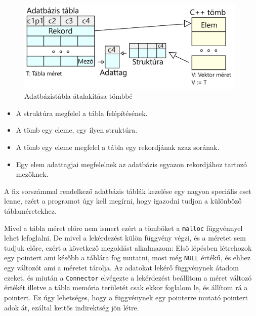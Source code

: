 \begin{figure}[h!]
\centering
\includegraphics[width=11cm]{images/data/structure.png}
\caption{Adatbázistábla átalakítása tömbbé}
\label{fig:opencl}
\end{figure}

\begin{itemize}
\item A struktúra megfelel a tábla felépítésének.
\item A tömb egy eleme, egy ilyen struktúra.
\item A tömb egy eleme megfelel a tábla egy rekordjának azaz sorának.
\item Egy elem adattagjai megfelelnek az adatbázis egyazon rekordjához tartozó mezőknek.
\end{itemize}

\newpage
{}

A fix sorszámmal rendelkező adatbázis táblák kezelése egy nagyon speciális eset lenne, ezért a programot úgy kell megírni, hogy igazodni tudjon a különböző táblaméretekhez.

Mivel a tábla méret előre nem ismert ezért a tömböket a \texttt{malloc} függvénnyel lehet lefoglalni. De mivel a lekérdezést külön függvény végzi, és a méretet sem tudjuk előre, ezért a következő megoldást alkalmazom:
Első lépésben létrehozok egy pointert ami később a táblára fog mutatni, most még \texttt{NULL} értékű, és ehhez egy változót ami a méretet tárolja. Az adatokat lekérő függvénynek átadom ezeket, és miután a \texttt{Connector} elvégezte a lekérdezést beállítom a méret változó értékét illetve a tábla memória területét csak ekkor foglalom le, és állítom rá a pointert. Ez úgy lehetséges, hogy a függvénynek egy pointerre mutató pointert adok át, ezáltal kettős indirektség jön létre.


